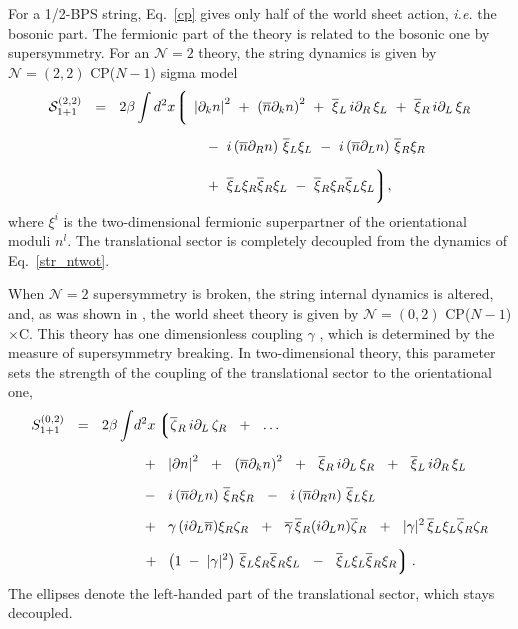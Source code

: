 \documentclass[12pt]{article}
\newcommand{\ntwo}{${\mathcal N}=2$ }
\newcommand{\ntwot}{${\mathcal N}= \left(2,2\right) $ }
\newcommand{\ntwoo}{${\mathcal N}= \left(0,2\right) $ }
\newcommand{\p}{\partial}
\newcommand{\ov}{\overline}
\newcommand{\mc}[1]{\mathcal{#1}}
\newcommand{\lgr}{\left\lgroup}
\newcommand{\rgr}{\right\rgroup}
\newcommand{\bxir}{\ov{\xi}{}_R}
\newcommand{\bxil}{\ov{\xi}{}_L}
\newcommand{\xir}{\xi_R}
\newcommand{\xil}{\xi_L}
\newcommand{\bzl}{\ov{\zeta}{}_L}
\newcommand{\bzr}{\ov{\zeta}{}_R}
\newcommand{\zr}{\zeta_R}
\newcommand{\zl}{\zeta_L}
\newcommand{\nbar}{\ov{n}}
\newcommand{\CPCn}{CP($N-1$)$\times$C}
\begin{document}
	For a 1/2-BPS string, Eq.~\eqref{cp} gives only half of the world sheet action, {\it i.e.} the bosonic part.
	The fermionic part of the theory is related to the bosonic one by supersymmetry.
	For an \ntwo theory, the string dynamics is given by \ntwot CP($N-1$) sigma model
\begin{align}
%
\notag
\mc{S}_{\rm 1+1}^{\rm (2,2)}  ~~=~~ 2\beta
	\int  d^2x
	\biggl\lgroup\; 
	&
	\left|\p_k n \right|^2  ~+~ \left(\ov{n}\p_k n\right)^2  
	~+~ \ov{\xi}{}_L\, i\p_R\, \xi_L  ~+~ \ov{\xi}{}_R\, i\p_L\,  \xi_R 
	\\[2mm]
%
\label{str_ntwot}
	&\;
	~~-~
	i \left(\nbar\p_R n\right)\, \bxil\xil ~-~ i \left(\nbar\p_Ln\right) \, \bxir\xir 
	\\[2mm]
%
\notag
	&\;
		~~+~
		\bxil \xir \bxir \xil ~-~ \bxir \xir \bxil \xil
	\biggr\rgroup ,
\end{align}
	where $ \xi^i $ is the two-dimensional fermionic superpartner of the orientational moduli $ n^l $.
	The translational sector is completely decoupled from the dynamics of Eq.~\eqref{str_ntwot}.

	When \ntwo supersymmetry is broken, the string internal dynamics is altered, and, as was shown
	in \cite{Edalati}, the world sheet theory is given by \ntwoo \CPCn.
	This theory has one dimensionless coupling $ \gamma $ \cite{SYhet,BSYhet}, which is determined by the
	measure of supersymmetry breaking.
	In two-dimensional theory, this parameter sets the strength of the coupling of the translational
	sector to the orientational one,
\begin{align}
%
\notag
S_{1+1}^{(0,2)} ~~=~~ 2\beta
	\int & d^2 x 
\lgr
	\bzr\, i\p_L\, \zr ~~+~~ \dots 
\right.
	\\[2mm]
%
\notag
	&
	\;\;
	+~~
	\left|\p n\right|^2 ~~+~~ \left(\ov{n}\p_k n\right)^2 ~~+~~
	\bxir \, i\p_L \, \xir  ~~+~~ \bxil \, i\p_R \, \xil 
	\\[2mm]
%
\label{world02}
	&
	\;\;
	-~~
	i \left(\ov{n}\p_L n\right)\, \bxir \xir ~~-~~ 
	i \left(\ov{n}\p_R n\right)\, \bxil \xil  
	\\[2mm]
%
\notag
	&
	\;\;
	+~~
	\gamma\, (i\p_L\nbar) \xir\zr ~~+~~ \ov{\gamma}\, \bxir (i\p_L n) \bzr ~~+~~
	|\gamma|^2\, \bxil\xil \bzr\zr  
	\\[2mm]
%
\notag
	&
	\;\;
\left.
	+~~ 
	\left( 1 \;-\; |\gamma|^2 \right)\, \bxil\xir \bxir\xil  
	~~-~~ \bxil\xil \bxir\xir
\rgr .
\end{align}
	The ellipses denote the left-handed part of the translational sector, which stays decoupled.
\end{document}
